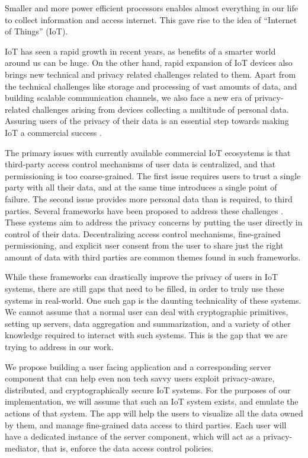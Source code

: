 Smaller and more power efficient processors enables almost everything in our life to collect information and access internet. This gave rise to the idea of “Internet of Things” (IoT).

IoT has seen a rapid growth in recent years, as benefits of a smarter world around us can be huge. On the other hand, rapid expansion of IoT devices also brings new technical and privacy related challenges related to them. Apart from the technical challenges like storage and processing of vast amounts of data, and building scalable communication channels, we also face a new era of privacy-related challenges arising from devices collecting a multitude of personal data. Assuring users of the privacy of their data is an essential step towards making IoT a commercial success \cite{davies}.

The primary issues with currently available commercial IoT ecosystems is that third-party access control mechanisms of user data is centralized, and that permissioning is too coarse-grained. The first issue requires users to trust a single party with all their data, and at the same time introduces a single point of failure. The second issue provides more personal data than is required, to third parties. Several frameworks have been proposed to address these challenges \cite{campbell} \cite{davies}. These systems aim to address the privacy concerns by putting the user directly in control of their data. Decentralizing access control mechanisms, fine-grained permissioning, and explicit user consent from the user to share just the right amount of data with third parties are common themes found in such frameworks.

While these frameworks can drastically improve the privacy of users in IoT systems, there are still gaps that need to be filled, in order to truly use these systems in real-world. One such gap is the daunting technicality of these systems. We cannot assume that a normal user can deal with cryptographic primitives, setting up servers, data aggregation and summarization, and a variety of other knowledge required to interact with such systems. This is the gap that we are trying to address in our work.

We propose building a user facing application and a corresponding server component that can help even non tech savvy users exploit privacy-aware, distributed, and cryptographically secure IoT systems. For the purposes of our implementation, we will assume that such an IoT system exists, and emulate the actions of that system. The app will help the users to visualize all the data owned by them, and manage fine-grained data access to third parties. Each user will have a dedicated instance of the server component, which will act as a privacy-mediator\cite{davies}, that is, enforce the data access control policies.

